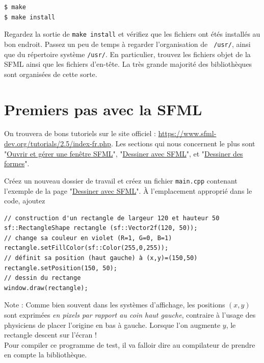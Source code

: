 \documentclass{book}
\def\filename{\texttt}
\begin{document}
\begin{verbatim}
$ make
$ make install
\end{verbatim}

Regardez la sortie de \texttt{make install} et vérifiez que les fichiers ont étés installés au bon endroit. Passez un peu de temps à regarder l'organisation de \texttt{~/usr/}, ainsi que du répertoire système \texttt{/usr/}. En particulier, trouvez les fichiers objet de la SFML ainsi que les fichiers d'en-tête. La très grande majorité des bibliothèques sont organisées de cette sorte.

\section{Premiers pas avec la SFML}

On trouvera de bons tutoriels sur le site officiel : \url{https://www.sfml-dev.org/tutorials/2.5/index-fr.php}. Les sections qui nous concernent le plus sont "\href{https://www.sfml-dev.org/tutorials/2.5/window-window-fr.php}{Ouvrir et gérer une fenêtre SFML}", "\href{https://www.sfml-dev.org/tutorials/2.5/graphics-draw-fr.php}{Dessiner avec SFML}", et "\href{https://www.sfml-dev.org/tutorials/2.5/graphics-shape-fr.php}{Dessiner des formes}".

Créez un nouveau dossier de travail et créez un fichier \filename{main.cpp} contenant l'exemple de la page "\href{https://www.sfml-dev.org/tutorials/2.5/graphics-draw-fr.php}{Dessiner avec SFML}". À l'emplacement approprié dans le code, ajoutez
\begin{verbatim}
// construction d'un rectangle de largeur 120 et hauteur 50
sf::RectangleShape rectangle (sf::Vector2f(120, 50));
// change sa couleur en violet (R=1, G=0, B=1)
rectangle.setFillColor(sf::Color(255,0,255));
// définit sa position (haut gauche) à (x,y)=(150,50)
rectangle.setPosition(150, 50);
// dessin du rectange
window.draw(rectangle);
\end{verbatim}

Note : Comme bien souvent dans les systèmes d'affichage, les positions $(x,y)$ sont exprimées \emph{en pixels par rapport au coin haut gauche}, contraire à l'usage des physiciens de placer l'origine en bas à gauche. Lorsque l'on augmente $y$, le rectangle descent sur l'écran !\\

Pour compiler ce programme de test, il va falloir dire au compilateur de prendre en compte la bibliothèque.
\end{document}
